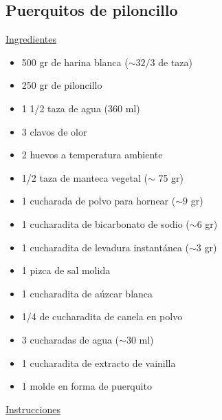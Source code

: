 \subsection{Puerquitos de piloncillo}
\underline{Ingredientes}
\begin{itemize}
\item 500 gr de harina blanca ($\sim 3 2/3$ de taza)
\item 250 gr de piloncillo
\item 1 1/2 taza de agua (360 ml)
\item 3 clavos de olor
\item 2 huevos a temperatura ambiente
\item 1/2 taza de manteca vegetal ($\sim$ 75 gr)
\item 1 cucharada de polvo para hornear ($\sim 9$ gr)
\item 1 cucharadita de bicarbonato de sodio ($\sim 6$ gr)
\item 1 cucharadita de levadura instant\'anea ($\sim 3$ gr)
\item 1 pizca de sal molida
\item 1 cucharadita de a\'uzcar blanca
\item 1/4 de cucharadita de canela en polvo
\item 3 cucharadas de agua ($\sim 30$ ml)
\item 1 cucharadita de extracto de vainilla
\item 1 molde en forma de puerquito

\end{itemize}

\underline{Instrucciones}


